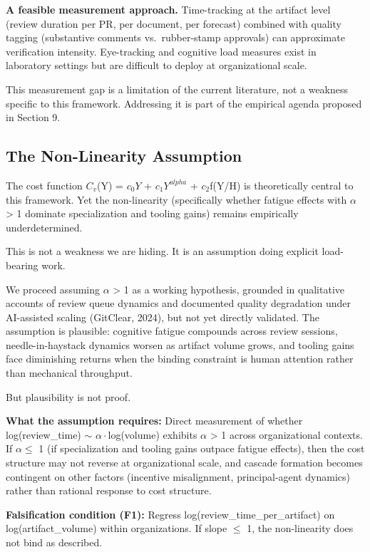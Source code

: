 \documentclass[11pt,a4paper]{article}
\begin{document}
\textbf{A feasible measurement approach.} Time-tracking at the artifact level (review duration per PR, per document, per forecast) combined with quality tagging (substantive comments vs.~rubber-stamp approvals) can approximate verification intensity. Eye-tracking and cognitive load measures exist in laboratory settings but are difficult to deploy at organizational scale.

This measurement gap is a limitation of the current literature, not a weakness specific to this framework. Addressing it is part of the empirical agenda proposed in Section 9.

\hypertarget{the-non-linearity-assumption}{%
\subsection{The Non-Linearity Assumption}\label{the-non-linearity-assumption}}

The cost function $C_v$(Y) = $c_0 Y$ + $c_1 Y^{alpha}$ + $c_2$f(Y/H) is theoretically central to this framework. Yet the non-linearity (specifically whether fatigue effects with $\alpha$ > 1 dominate specialization and tooling gains) remains empirically underdetermined.

This is not a weakness we are hiding. It is an assumption doing explicit load-bearing work.

We proceed assuming $\alpha$ > 1 as a working hypothesis, grounded in qualitative accounts of review queue dynamics and documented quality degradation under AI-assisted scaling (GitClear, 2024), but not yet directly validated. The assumption is plausible: cognitive fatigue compounds across review sessions, needle-in-haystack dynamics worsen as artifact volume grows, and tooling gains face diminishing returns when the binding constraint is human attention rather than mechanical throughput.

But plausibility is not proof.

\textbf{What the assumption requires:} Direct measurement of whether log(review\_time) $\sim$ $\alpha\cdot$log(volume) exhibits $\alpha$ > 1 across organizational contexts. If $\alpha \leq$ 1 (if specialization and tooling gains outpace fatigue effects), then the cost structure may not reverse at organizational scale, and cascade formation becomes contingent on other factors (incentive misalignment, principal-agent dynamics) rather than rational response to cost structure.

\textbf{Falsification condition (F1):} Regress log(review\_time\_per\_artifact) on log(artifact\_volume) within organizations. If slope $\leq$ 1, the non-linearity does not bind as described.
\end{document}
